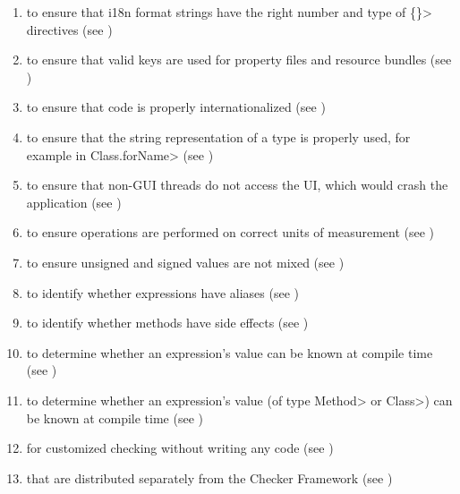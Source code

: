 \begin{enumerate}
  )
\item
  to ensure that i18n format strings have the right number and type of
  \<\{\}> directives (see )
\item
   to ensure that valid
  keys are used for property files and resource bundles (see
  )
\item
   to
  ensure that code is properly internationalized (see
  )
\item
   to ensure that the
  string representation of a type is properly used, for example in
  \<Class.forName> (see )
\item
   to ensure that non-GUI
  threads do not access the UI, which would crash the application
  (see )
\item
   to ensure operations are
  performed on correct units of measurement
  (see )
\item
   to
  ensure unsigned and signed values are not mixed
  (see )
\item
   to identify whether
  expressions have aliases (see )
\item
   to identify whether
  methods have side effects (see )
\item
   to determine
  whether an expression's value can be known at compile time
  (see )
\item
   to determine
  whether an expression's value (of type \<Method> or \<Class>) can be known at compile time
  (see )
\item
   for customized checking without
  writing any code (see )
\item
   that are distributed
  separately from the Checker Framework
  (see )


\end{enumerate}
